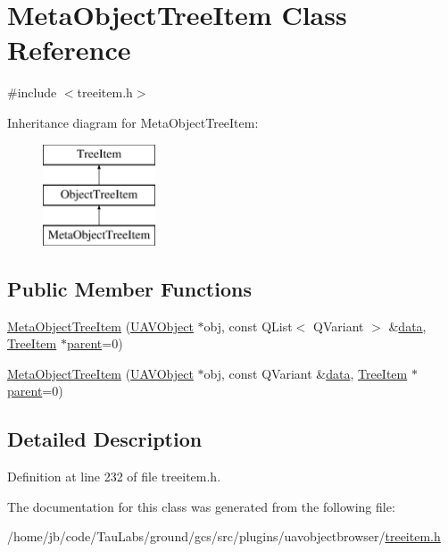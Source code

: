 \hypertarget{class_meta_object_tree_item}{\section{\-Meta\-Object\-Tree\-Item \-Class \-Reference}
\label{class_meta_object_tree_item}
}


{\ttfamily \#include $<$treeitem.\-h$>$}

\-Inheritance diagram for \-Meta\-Object\-Tree\-Item\-:\begin{figure}[H]
\begin{center}
\leavevmode
\includegraphics[height=3.000000cm]{class_meta_object_tree_item}
\end{center}
\end{figure}
\subsection*{\-Public \-Member \-Functions}
\begin{DoxyCompactItemize}
\item 
\hyperlink{group___u_a_v_object_browser_plugin_gaccbd935f55017692b1051678b5f53ad8}{\-Meta\-Object\-Tree\-Item} (\hyperlink{class_u_a_v_object}{\-U\-A\-V\-Object} $\ast$obj, const \-Q\-List$<$ \-Q\-Variant $>$ \&\hyperlink{group___u_a_v_object_browser_plugin_ga7c5708ae3cbba9c509f497c493beccb6}{data}, \hyperlink{class_tree_item}{\-Tree\-Item} $\ast$\hyperlink{group___u_a_v_object_browser_plugin_gaa3a7ba624312b6be70872634db291881}{parent}=0)
\item 
\hyperlink{group___u_a_v_object_browser_plugin_ga13e8806399befff9a6db4becc66810d7}{\-Meta\-Object\-Tree\-Item} (\hyperlink{class_u_a_v_object}{\-U\-A\-V\-Object} $\ast$obj, const \-Q\-Variant \&\hyperlink{group___u_a_v_object_browser_plugin_ga7c5708ae3cbba9c509f497c493beccb6}{data}, \hyperlink{class_tree_item}{\-Tree\-Item} $\ast$\hyperlink{group___u_a_v_object_browser_plugin_gaa3a7ba624312b6be70872634db291881}{parent}=0)
\end{DoxyCompactItemize}


\subsection{\-Detailed \-Description}


\-Definition at line 232 of file treeitem.\-h.



\-The documentation for this class was generated from the following file\-:\begin{DoxyCompactItemize}
\item 
/home/jb/code/\-Tau\-Labs/ground/gcs/src/plugins/uavobjectbrowser/\hyperlink{treeitem_8h}{treeitem.\-h}\end{DoxyCompactItemize}
